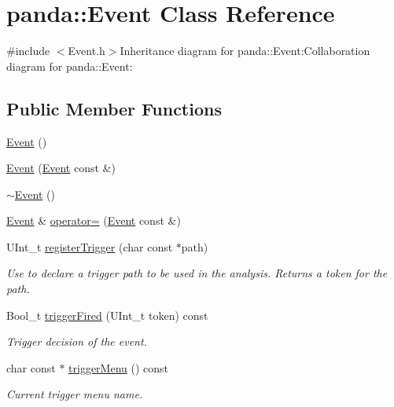 \hypertarget{classpanda_1_1Event}{
\section{panda::Event Class Reference}
\label{classpanda_1_1Event}
}


{\ttfamily \#include $<$Event.h$>$}Inheritance diagram for panda::Event:Collaboration diagram for panda::Event:\subsection*{Public Member Functions}
\begin{DoxyCompactItemize}
\item 
\hyperlink{classpanda_1_1Event_afa0708d0da41a890950b73745b679c8f}{Event} ()
\item 
\hyperlink{classpanda_1_1Event_ab444c3beac70a3b85dbb86134cc8456a}{Event} (\hyperlink{classpanda_1_1Event}{Event} const \&)
\item 
\hyperlink{classpanda_1_1Event_a7519b814d0f3d3beb8c68aca49e14d61}{$\sim$Event} ()
\item 
\hyperlink{classpanda_1_1Event}{Event} \& \hyperlink{classpanda_1_1Event_a8b69d2507d829f979c498807a14cd4a6}{operator=} (\hyperlink{classpanda_1_1Event}{Event} const \&)
\item 
UInt\_\-t \hyperlink{classpanda_1_1Event_aa677c9bdbd32efd3652269efbfa9b659}{registerTrigger} (char const $\ast$path)
\begin{DoxyCompactList}\small\item\em Use to declare a trigger path to be used in the analysis. Returns a token for the path. \item\end{DoxyCompactList}\item 
Bool\_\-t \hyperlink{classpanda_1_1Event_acd59c2cd1de4db37626f6b6f9a371a63}{triggerFired} (UInt\_\-t token) const 
\begin{DoxyCompactList}\small\item\em Trigger decision of the event. \item\end{DoxyCompactList}\item 
char const $\ast$ \hyperlink{classpanda_1_1Event_ad091ad7fd273c9d22469cea19e97d136}{triggerMenu} () const 
\begin{DoxyCompactList}\small\item\em Current trigger menu name. \item\end{DoxyCompactList}\end{DoxyCompactItemize}
